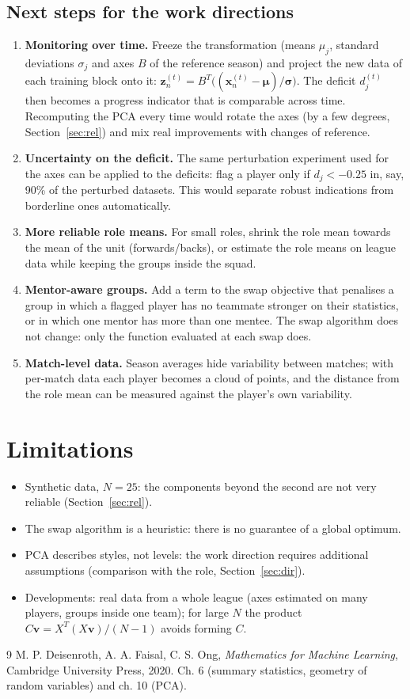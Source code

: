 \documentclass[11pt,a4paper]{article}
\theoremstyle{remark}
\newcommand{\x}{\mathbf{x}}
\newcommand{\z}{\mathbf{z}}
\begin{document}
\subsection{Next steps for the work directions}
\begin{enumerate}
\item \textbf{Monitoring over time.} Freeze the transformation (means $\mu_j$, standard deviations $\sigma_j$ and
axes $B$ of the reference season) and project the new data of each training block onto it:
$\z_n^{(t)}=B^T\big((\x_n^{(t)}-\boldsymbol\mu)/\boldsymbol\sigma\big)$. The deficit $d_j^{(t)}$ then becomes
a progress indicator that is comparable across time. Recomputing the PCA every time would rotate the axes
(by a few degrees, Section~\ref{sec:rel}) and mix real improvements with changes of reference.
\item \textbf{Uncertainty on the deficit.} The same perturbation experiment used for the axes can be applied to the
deficits: flag a player only if $d_j<-0.25$ in, say, 90\% of the perturbed datasets. This would separate robust
indications from borderline ones automatically.
\item \textbf{More reliable role means.} For small roles, shrink the role mean towards the mean of the unit
(forwards/backs), or estimate the role means on league data while keeping the groups inside the squad.
\item \textbf{Mentor-aware groups.} Add a term to the swap objective that penalises a group in which a flagged player
has no teammate stronger on their statistics, or in which one mentor has more than one mentee. The swap algorithm
does not change: only the function evaluated at each swap does.
\item \textbf{Match-level data.} Season averages hide variability between matches; with per-match data each player
becomes a cloud of points, and the distance from the role mean can be measured against the player's own variability.
\end{enumerate}

\section{Limitations}
\begin{itemize}
\item Synthetic data, $N=25$: the components beyond the second are not very reliable (Section~\ref{sec:rel}).
\item The swap algorithm is a heuristic: there is no guarantee of a global optimum.
\item PCA describes styles, not levels: the work direction requires additional assumptions
(comparison with the role, Section~\ref{sec:dir}).
\item Developments: real data from a whole league (axes estimated on many players, groups inside one team);
for large $N$ the product $C\mathbf v=X^T(X\mathbf v)/(N-1)$ avoids forming $C$.
\end{itemize}

\begin{thebibliography}{9}
 M. P. Deisenroth, A. A. Faisal, C. S. Ong, \emph{Mathematics for Machine Learning}, Cambridge University Press, 2020. Ch. 6 (summary statistics, geometry of random variables) and ch. 10 (PCA).
\end{thebibliography}
\end{document}
